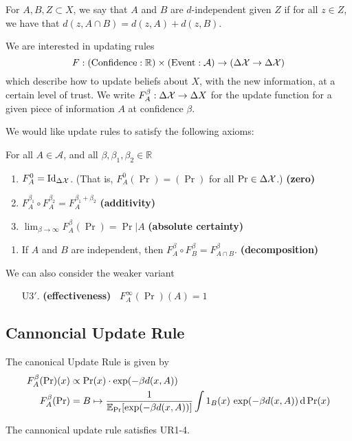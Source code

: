 \documentclass{article}
\DeclareMathOperator{\supp}{\mathrm{Supp}}
\begin{document}
\begin{defn}
For $A,B,Z \subset X$,
we say that $A$ and $B$ are $d$-independent given $Z$ if
for all $z \in Z$, we have that
$d(z, A \cap B) = d(z, A) + d(z,B)$.
\end{defn}

We are interested in updating rules
\[
    F: (\text{Confidence} : \mathbb R) \times (\text{Event} : \mathcal A) \to (\Delta\mathcal X  \to \Delta \mathcal X)
\]
which describe how to update beliefs about $X$, with the new information, at a certain level of trust. We write $F^\beta_A : \Delta\mathcal X \to \Delta X$ for the update function for a given piece of information $A$ at confidence $\beta$.

We would like update rules to satisfy the following axioms:

For all $A \in \mathcal A$, and all $\beta,\beta_1, \beta_2 \in \mathbb R$
\begin{enumerate}[label=UR\arabic{*}.,nosep]
    \item  $F^{0}_A  =  \mathrm{Id}_{\Delta\mathcal X}$. (That is, $F^{0}_A(\Pr) = (\Pr)$ for all $\Pr \in \Delta\mathcal X$.)
        \hfill \textbf{(zero)}
    \item $F^{\beta_1}_A \circ F^{\beta_2}_A = F^{\beta_1 + \beta_2}_A$
        \hfill \textbf{(additivity)}
    \item $\displaystyle \lim_{\beta\to\infty} F^\beta_A (\Pr) = \Pr|A$
        \hfill \textbf{(absolute certainty)}
\end{enumerate}

\begin{enumerate}[resume,label=UR\arabic{*}.]
    \item If $A$ and $B$ are independent, then $F^{\beta}_A \circ F^{\beta}_B = F^{\beta}_{A \cap B}$.
        \hfill \textbf{(decomposition)}
\end{enumerate}

We can also consider the weaker variant
\begin{enumerate}
    \item[U3$'$.]  \textbf{(effectiveness)~} $F^\infty_A (\Pr)(A) = 1$

\end{enumerate}


\subsection*{Cannoncial Update Rule}
The canonical Update Rule is given by
\begin{align*}
    F^\beta_A(\Pr)(x) &\propto \Pr(x) \cdot \exp(-\beta d(x, A)) \\
    F^\beta_A(\Pr) &= B \mapsto \frac{1}{\operatorname*{\mathbb{E}}_{\Pr}[\exp(-\beta d(x,A))]}\int
        1_B(x) \, \exp(-\beta d(x, A)) \,\mathrm d\Pr(x)
\end{align*}
\begin{prop}
    The cannonical update rule satisfies UR1-4.
\end{prop}
\end{document}
